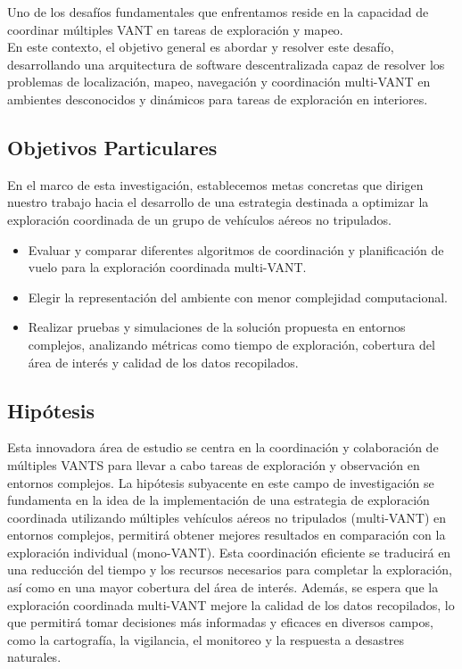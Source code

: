 \documentclass[sigconf]{acmart}
\begin{document}
Uno de los desafíos fundamentales que enfrentamos reside en la capacidad de coordinar múltiples VANT en tareas de exploración y mapeo.\\

En este contexto, el objetivo general es abordar y resolver este desafío, desarrollando una arquitectura de software descentralizada capaz de resolver los problemas de localización, mapeo, navegación y coordinación multi-VANT en ambientes desconocidos y dinámicos para tareas de exploración en interiores.

\subsection*{Objetivos Particulares}

En el marco de esta investigación, establecemos metas concretas que dirigen nuestro trabajo hacia el desarrollo de una estrategia destinada a optimizar la exploración coordinada de un grupo de vehículos aéreos no tripulados.\\

\begin{itemize}
\item Evaluar y comparar diferentes algoritmos de coordinación y planiﬁcación de vuelo para la exploración coordinada multi-VANT.
\item Elegir la representación del ambiente con menor complejidad computacional.
\item Realizar pruebas y simulaciones de la solución propuesta en entornos complejos, analizando métricas como tiempo de exploración, cobertura del área de interés y calidad de los datos recopilados.
\end{itemize}

\subsection*{Hipótesis}

Esta innovadora área de estudio se centra en la coordinación y colaboración de múltiples VANTS para llevar a cabo tareas de exploración y observación en entornos complejos. La hipótesis subyacente en este campo de investigación se fundamenta en la idea de la implementación de una estrategia de exploración coordinada utilizando múltiples vehículos aéreos no tripulados (multi-VANT) en entornos complejos, permitirá obtener mejores resultados en comparación con la exploración individual (mono-VANT). Esta coordinación eﬁciente se traducirá en una reducción del tiempo y los recursos necesarios para completar la exploración, así como en una mayor cobertura del área de interés. Además, se espera que la exploración coordinada multi-VANT mejore la calidad de los datos recopilados, lo que permitirá tomar decisiones más informadas y eﬁcaces en diversos campos, como la cartografía, la vigilancia, el monitoreo y la respuesta a desastres naturales.
\end{document}
